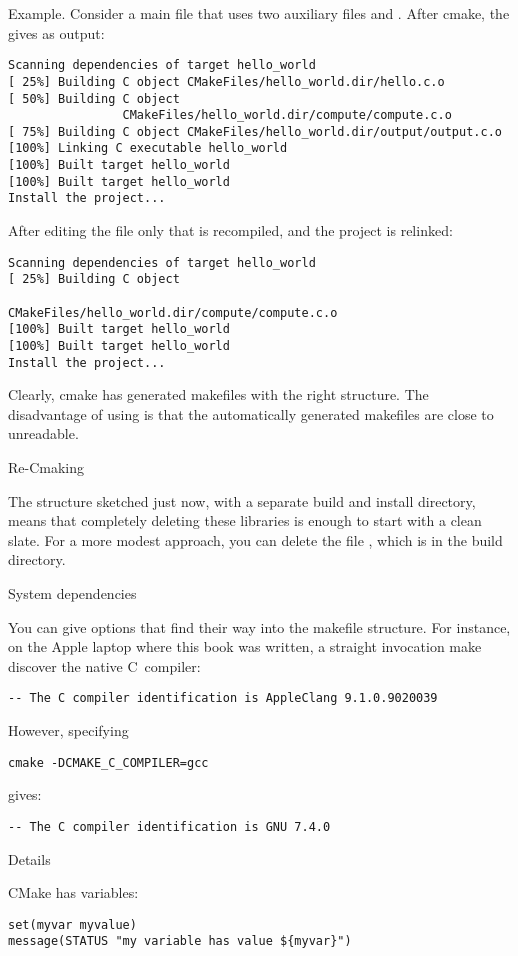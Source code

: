 Example. Consider a main file  that uses two auxiliary
files  and . After cmake, the  gives as output:
\begin{verbatim}
Scanning dependencies of target hello_world
[ 25%] Building C object CMakeFiles/hello_world.dir/hello.c.o
[ 50%] Building C object
                CMakeFiles/hello_world.dir/compute/compute.c.o
[ 75%] Building C object CMakeFiles/hello_world.dir/output/output.c.o
[100%] Linking C executable hello_world
[100%] Built target hello_world
[100%] Built target hello_world
Install the project...
\end{verbatim}
After editing the  file only that is recompiled, and the
project is relinked:
\begin{verbatim}
Scanning dependencies of target hello_world
[ 25%] Building C object
                
CMakeFiles/hello_world.dir/compute/compute.c.o
[100%] Built target hello_world
[100%] Built target hello_world
Install the project...
\end{verbatim}
Clearly, cmake has generated makefiles with the right structure.
The disadvantage of using  is that the automatically
generated makefiles are close to unreadable.

 {Re-Cmaking}

The structure sketched just now, with a separate build and install
directory, means that completely deleting these libraries is enough to
start with a clean slate. For a more modest approach, you can delete
the file , which is in the build directory.

 {System dependencies}

You can give  options that find their way into the makefile
structure. For instance, on the Apple laptop where this book was
written, a straight invocation make  discover the native C~compiler:
\begin{verbatim}
-- The C compiler identification is AppleClang 9.1.0.9020039
\end{verbatim}
However, specifying
\begin{verbatim}
cmake -DCMAKE_C_COMPILER=gcc
\end{verbatim}
gives:
\begin{verbatim}
-- The C compiler identification is GNU 7.4.0
\end{verbatim}

 {Details}

CMake has variables:
\begin{verbatim}
set(myvar myvalue)
message(STATUS "my variable has value ${myvar}")
\end{verbatim}


